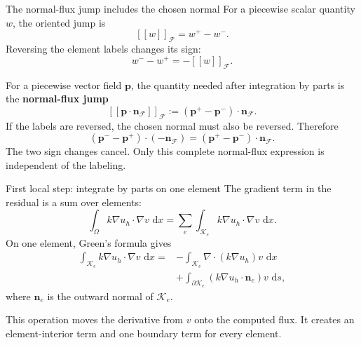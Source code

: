 \documentclass[11pt,aspectratio=169]{beamer}
\newcommand{\dd}{\,\mathrm{d}}
\newcommand{\Om}{\Omega}
\newcommand{\grad}{\nabla}
\newcommand{\divg}{\nabla\!\cdot}
\newcommand{\bn}{\bm n}
\begin{document}
\begin{frame}{The normal-flux jump includes the chosen normal}
For a piecewise scalar quantity $w$, the oriented jump is
\[
  [\![w]\!]_{\mathcal F}=w^+-w^-.
\]
Reversing the element labels changes its sign:
\[
  w^--w^+=-[\![w]\!]_{\mathcal F}.
\]

For a piecewise vector field $\bm p$, the quantity needed after integration
by parts is the \textbf{normal-flux jump}
\[
  [\![\bm p\cdot\bn_{\mathcal F}]\!]_{\mathcal F}
  :=(\bm p^+-\bm p^-)\cdot\bn_{\mathcal F}.
\]
If the labels are reversed, the chosen normal must also be reversed. Therefore
\[
  (\bm p^--\bm p^+)\cdot(-\bn_{\mathcal F})
  =(\bm p^+-\bm p^-)\cdot\bn_{\mathcal F}.
\]
The two sign changes cancel. Only this complete normal-flux expression is
independent of the labeling.
\end{frame}

\begin{frame}{First local step: integrate by parts on one element}
The gradient term in the residual is a sum over elements:
\[
  \int_\Om k\grad u_h\cdot\grad v\,\dd x
  =\sum_e\int_{\mathcal K_e}k\grad u_h\cdot\grad v\,\dd x.
\]
On one element, Green's formula gives
\[
\begin{aligned}
 \int_{\mathcal K_e}k\grad u_h\cdot\grad v\,\dd x
 ={}&-\int_{\mathcal K_e}\divg(k\grad u_h)v\,\dd x\\
 &+\int_{\partial\mathcal K_e}
 (k\grad u_h\cdot\bn_e)v\,\dd s,
\end{aligned}
\]
where $\bn_e$ is the outward normal of $\mathcal K_e$.

\vspace{0.2cm}
This operation moves the derivative from $v$ onto the computed flux. It
creates an element-interior term and one boundary term for every element.
\end{frame}
\end{document}
